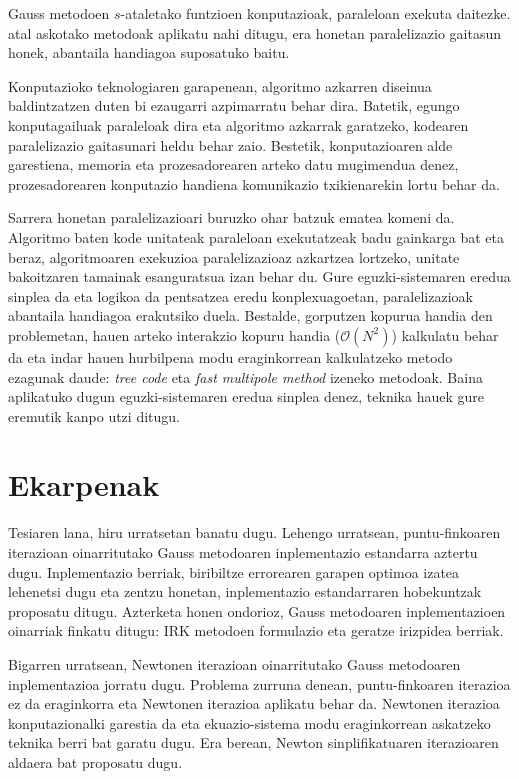 Gauss metodoen $s$-ataletako funtzioen konputazioak, paraleloan exekuta daitezke. atal askotako metodoak aplikatu nahi ditugu, era honetan paralelizazio gaitasun honek, abantaila handiagoa suposatuko baitu.

Konputazioko teknologiaren garapenean, algoritmo azkarren diseinua baldintzatzen duten bi ezaugarri azpimarratu behar dira. Batetik, egungo konputagailuak paraleloak dira eta algoritmo azkarrak garatzeko, kodearen paralelizazio gaitasunari heldu behar zaio. Bestetik, konputazioaren alde garestiena, memoria eta prozesadorearen arteko datu mugimendua denez, prozesadorearen konputazio handiena komunikazio txikienarekin lortu behar da.  

Sarrera honetan paralelizazioari buruzko ohar batzuk ematea komeni da. Algoritmo baten kode unitateak paraleloan exekutatzeak badu gainkarga bat eta beraz,  algoritmoaren exekuzioa paralelizazioaz azkartzea lortzeko,  unitate bakoitzaren tamainak esanguratsua izan behar du. Gure eguzki-sistemaren eredua sinplea da eta logikoa da pentsatzea eredu konplexuagoetan, paralelizazioak abantaila handiagoa erakutsiko duela. Bestalde, gorputzen kopurua handia den problemetan, hauen arteko interakzio kopuru  handia ($\mathcal{O}(N^2)$) kalkulatu behar da  eta indar hauen hurbilpena modu eraginkorrean kalkulatzeko metodo ezagunak daude: \textit {tree code}\cite{Barnes1986} eta \textit {fast multipole method}\cite{Carrier1988} izeneko metodoak. Baina aplikatuko dugun eguzki-sistemaren eredua sinplea denez, teknika hauek gure eremutik kanpo utzi ditugu. 


\section{Ekarpenak}


Tesiaren lana, hiru urratsetan banatu dugu. Lehengo urratsean, puntu-finkoaren iterazioan oinarritutako Gauss metodoaren inplementazio estandarra aztertu dugu. Inplementazio berriak, biribiltze errorearen garapen optimoa izatea lehenetsi dugu eta zentzu honetan, inplementazio estandarraren hobekuntzak proposatu ditugu. Azterketa honen ondorioz, Gauss metodoaren inplementazioen oinarriak finkatu ditugu: IRK metodoen formulazio eta geratze irizpidea berriak.

Bigarren urratsean, Newtonen iterazioan oinarritutako Gauss metodoaren inplementazioa jorratu dugu. Problema zurruna denean, puntu-finkoaren iterazioa ez da eraginkorra eta Newtonen iterazioa aplikatu behar da. Newtonen iterazioa konputazionalki garestia da eta ekuazio-sistema modu eraginkorrean askatzeko teknika berri bat garatu dugu. Era berean, Newton sinplifikatuaren iterazioaren aldaera bat proposatu dugu. 


